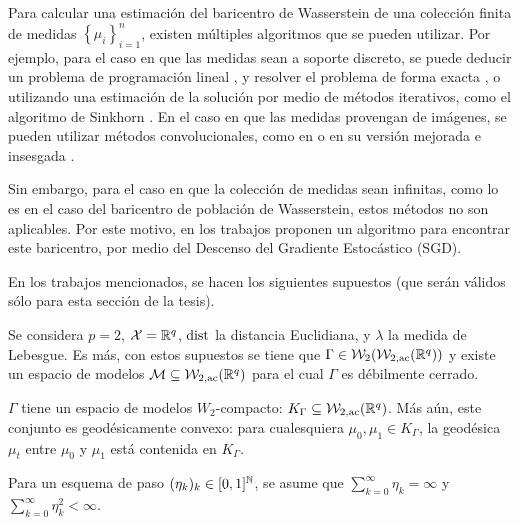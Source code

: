 Para calcular una estimación del baricentro de Wasserstein de una colección finita de medidas $\left\{ \mu_i \right\}_{i=1}^{n}$, existen múltiples algoritmos que se pueden utilizar. Por ejemplo, para el caso en que las medidas sean a soporte discreto, se puede deducir un problema de programación lineal \cite[ver Cap. 3]{peyre2019computational}, y resolver el problema de forma exacta \cite{bonneel2011displacement}, o utilizando una estimación de la solución por medio de métodos iterativos, como el algoritmo de Sinkhorn \cite{cuturi2013sinkhorn}. En el caso en que las medidas provengan de imágenes, se pueden utilizar métodos convolucionales, como en \cite{solomon2015convolutional} o en su versión mejorada e insesgada \cite{janati2020debiased}.

Sin embargo, para el caso en que la colección de medidas sean infinitas, como lo es en el caso del baricentro de población de Wasserstein, estos métodos no son aplicables. Por este motivo, en los trabajos \cite{rios2020contributions,backhoff2022stochastic,backhoff2022bayesian} proponen un algoritmo para encontrar este baricentro, por medio del Descenso del Gradiente Estocástico (SGD).

En los trabajos mencionados, se hacen los siguientes supuestos (que serán válidos sólo para esta sección de la tesis).

\begin{assumption}\label{assump:caso-particular-lebesgue}
    Se considera $p=2$, $\cX = \R^q$, $\dist$ la distancia Euclidiana, y $\lambda$ la medida de Lebesgue. Es más, con estos supuestos se tiene que $\Gamma \in \WassersteinSpace[2]{\WassersteinSpace[2,\mathrm{ac}]{\R^q} } $ y existe un espacio de modelos $\Models \subseteq \WassersteinSpace[2, \mathrm{ac}]{\R^q} $ para el cual $\Gamma$ es débilmente cerrado.
\end{assumption}

\begin{assumption}\label{assump:caso-particular-geodesicamente-convexo}
    $\Gamma$ tiene un espacio de modelos $W_2$-compacto: $K_\Gamma \subseteq \WassersteinSpace[2,\mathrm{ac}]{\R^q} $. Más aún, este conjunto es geodésicamente convexo: para cualesquiera $\mu_0, \mu_1 \in K_\Gamma$, la geodésica $\mu_t$ entre $\mu_0$ y $\mu_1$ está contenida en $K_\Gamma$.
\end{assumption}

\begin{assumption}\label{assump:caso-particular-esquema-paso-L1-L2}
    Para un esquema de paso $(\eta_k)_k \in [0, 1]^\N$, se asume que $\sum_{k=0}^{\infty} \eta_k = \infty$ y $\sum_{k=0}^{\infty} \eta_k^2 < \infty$.
\end{assumption}

